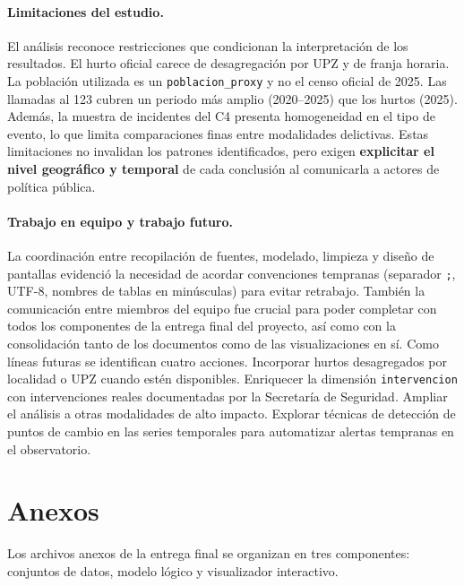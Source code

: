 \documentclass[12pt,letterpaper]{article}
\begin{document}
\paragraph{Limitaciones del estudio.}
El análisis reconoce restricciones que condicionan la interpretación de los resultados. El hurto oficial carece de desagregación por UPZ y de franja horaria. La población utilizada es un \texttt{poblacion\_proxy} y no el censo oficial de 2025. Las llamadas al 123 cubren un periodo más amplio (2020--2025) que los hurtos (2025). Además, la muestra de incidentes del C4 presenta homogeneidad en el tipo de evento, lo que limita comparaciones finas entre modalidades delictivas. Estas limitaciones no invalidan los patrones identificados, pero exigen \textbf{explicitar el nivel geográfico y temporal} de cada conclusión al comunicarla a actores de política pública.

\paragraph{Trabajo en equipo y trabajo futuro.}
La coordinación entre recopilación de fuentes, modelado, limpieza y diseño de pantallas evidenció la necesidad de acordar convenciones tempranas (separador \texttt{;}, UTF-8, nombres de tablas en minúsculas) para evitar retrabajo. También la comunicación entre miembros del equipo fue crucial para poder completar con todos los componentes de la entrega final del proyecto, así como con la consolidación tanto de los documentos como de las visualizaciones en sí. Como líneas futuras se identifican cuatro acciones. Incorporar hurtos desagregados por localidad o UPZ cuando estén disponibles. Enriquecer la dimensión \texttt{intervencion} con intervenciones reales documentadas por la Secretaría de Seguridad. Ampliar el análisis a otras modalidades de alto impacto. Explorar técnicas de detección de puntos de cambio en las series temporales para automatizar alertas tempranas en el observatorio.

\section{Anexos}

Los archivos anexos de la entrega final se organizan en tres componentes: conjuntos de datos, modelo lógico y visualizador interactivo.
\end{document}

